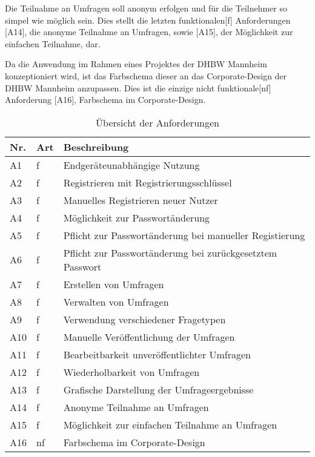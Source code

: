 Die Teilnahme an Umfragen soll anonym erfolgen und für die Teilnehmer so simpel wie möglich sein.
Dies stellt die letzten funktionalen[f] Anforderungen [A14], die anonyme Teilnahme an Umfragen, sowie [A15], der Möglichkeit zur einfachen Teilnahme, dar.

Da die Anwendung im Rahmen eines Projektes der \acs{DHBW} Mannheim konzeptioniert wird, ist das Farbschema dieser an das Corporate-Design der \acs{DHBW} Mannheim anzupassen.
Dies ist die einzige nicht funktionale[nf] Anforderung [A16], Farbschema im Corporate-Design.

\begin{table}
  \setlength\extrarowheight{3pt}
\centering
  \begin{tabular}{|C{1cm}|C{1cm}|L{12cm}|}
    \hline
    \textbf{Nr.} & \textbf{Art} & \textbf{Beschreibung} \\
    \hline
    {\label{Anf:A1}A1} & f & Endgeräteunabhängige Nutzung \\
    \hline
    {\label{Anf:A2}A2} & f & Registrieren mit Registrierungsschlüssel \\
    \hline
    {\label{Anf:A3}A3} & f & Manuelles Registrieren neuer Nutzer \\
    \hline
    {\label{Anf:A4}A4} & f & Möglichkeit zur Passwortänderung \\
    \hline
    {\label{Anf:A5}A5} & f & Pflicht zur Passwortänderung bei manueller Registierung \\
    \hline
    {\label{Anf:A6}A6} & f & Pflicht zur Passwortänderung bei zurückgesetztem Passwort \\
    \hline
    {\label{Anf:A7}A7} & f & Erstellen von Umfragen \\
    \hline
    {\label{Anf:A8}A8} & f & Verwalten von Umfragen \\
    \hline
    {\label{Anf:A9}A9} & f & Verwendung verschiedener Fragetypen \\
    \hline
    {\label{Anf:A10}A10} & f & Manuelle Veröffentlichung der Umfragen \\
    \hline
    {\label{Anf:A11}A11} & f & Bearbeitbarkeit unveröffentlichter Umfragen \\
    \hline
    {\label{Anf:A12}A12} & f & Wiederholbarkeit von Umfragen \\
    \hline
    {\label{Anf:A13}A13} & f & Grafische Darstellung der Umfrageergebnisse \\
    \hline
    {\label{Anf:A14}A14} & f & Anonyme Teilnahme an Umfragen \\
    \hline
    {\label{Anf:A15}A15} & f & Möglichkeit zur einfachen Teilnahme an Umfragen \\
    \hline
    {\label{Anf:A16}A16} & nf & Farbschema im Corporate-Design \\
    \hline
  \end{tabular}
  \caption{Übersicht der Anforderungen}
  \label{tab:Anforderungen}
\end{table}

